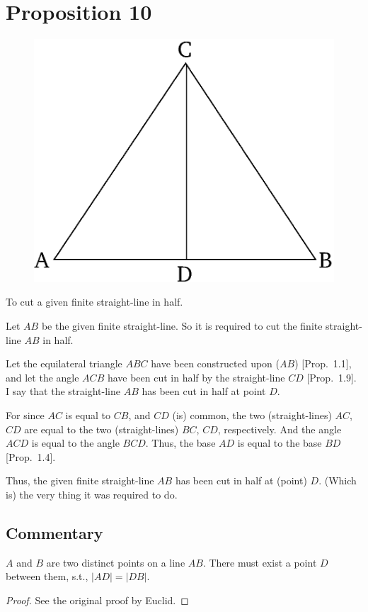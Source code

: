 \chapter*{Proposition 10}
\label{prop:10}

\begin{figure}[ht]
    \begin{center}
    \includegraphics[width=0.5\linewidth]{figures/fig10e.eps}
    \label{fig:prop_10}
    \end{center}
\end{figure}

To cut a given finite straight-line in half.

Let $AB$ be the given finite straight-line. So it is required to cut the
finite straight-line $AB$ in half.

Let the equilateral triangle $ABC$ have been constructed upon  ($AB$)
[Prop.~1.1], and let the angle $ACB$ have been cut in half by the
straight-line $CD$ [Prop.~1.9]. I say that the straight-line $AB$ has been
cut in half at  point $D$.

For since $AC$ is equal to $CB$, and $CD$ (is) common, the two (straight-lines) $AC$, $CD$
are equal to the two (straight-lines) $BC$, $CD$, respectively. And the angle $ACD$ is
equal to the angle $BCD$. Thus, the base $AD$ is equal to the base $BD$
[Prop.~1.4].

Thus, the given finite straight-line $AB$ has been cut in half at  (point) $D$. 
(Which is) the
very thing it was required to do.


\section*{Commentary}

\begin{proposition}\label{proposition_10}\leanok
    $A$ and $B$ are two distinct points on a line $AB$. There must exist a point $D$ between them, s.t., $|AD| = |DB|$.
\end{proposition}
\begin{proof}
    \leanok
    See the original proof by Euclid.
\end{proof}
